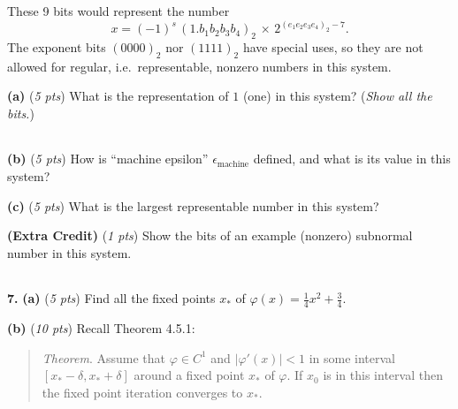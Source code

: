 \documentclass[11pt]{amsart}
\newcommand{\eps}{\epsilon}
\newcommand{\prob}[1]{\bigskip\noindent\textbf{#1.} }
\newcommand{\pts}[1]{(\emph{#1 pts})}
\newcommand{\ppartpts}[2]{\textbf{(#1)} \pts{#2} \quad}
\newcommand{\epartpts}[2]{\medskip\noindent \textbf{(#1)} \pts{#2} \quad}
\begin{document}
\noindent These 9 bits would represent the number
\medskip\large
\begin{equation*}
	x = (-1)^s\,(1.b_1 b_2 b_3 b_4)_2 \,\times\, 2^{(e_1 e_2 e_3 e_4)_2 - 7}.
\end{equation*}
The exponent bits $(0000)_2$ nor $(1111)_2$ have special uses, so they are not allowed for regular, i.e.~representable, nonzero numbers in this system.
\normalsize

\medskip
\epartpts{a}{5}  What is the representation of $1$ (one) in this system?  (\emph{Show all the bits.})
\vspace{0.8in}

\hfill \begin{tabular}{|c|c|c|c|c|c|c|c|c|} \hline
\phantom{$m$} & \phantom{$m$} & \phantom{$m$} & \phantom{$m$} & \phantom{$m$} & \phantom{$m$} & \phantom{$m$} & \phantom{$m$} & \phantom{$a$} \LARGE \strut \\ \hline
\end{tabular}

\bigskip
\epartpts{b}{5}  How is ``machine epsilon'' $\eps_{\text{machine}}$ defined, and what is its value in this system?
\vfill

\epartpts{c}{5}  What is the largest representable number in this system?
\vfill

\epartpts{Extra Credit}{1}  Show the bits of an example (nonzero) subnormal number in this system.
\bigskip

\hfill \begin{tabular}{|c|c|c|c|c|c|c|c|c|} \hline
\phantom{$m$} & \phantom{$m$} & \phantom{$m$} & \phantom{$m$} & \phantom{$m$} & \phantom{$m$} & \phantom{$m$} & \phantom{$m$} & \phantom{$a$} \LARGE \strut \\ \hline
\end{tabular}

\newpage
\prob{7}  \ppartpts{a}{5}  Find all the fixed points $x_\ast$ of $\varphi(x) = \frac{1}{4} x^2 + \frac{3}{4}$.
\vspace{2.5in}

\epartpts{b}{10} Recall Theorem 4.5.1:

\medskip
\begin{quote}
\noindent \emph{Theorem}.  Assume that $\varphi\in C^1$ and $|\varphi'(x)|<1$ in some interval $[x_\ast - \delta,x_\ast+\delta]$ around a fixed point $x_\ast$ of $\varphi$.  If $x_0$ is in this interval then the fixed point iteration converges to $x_\ast$.
\end{quote}
\end{document}

